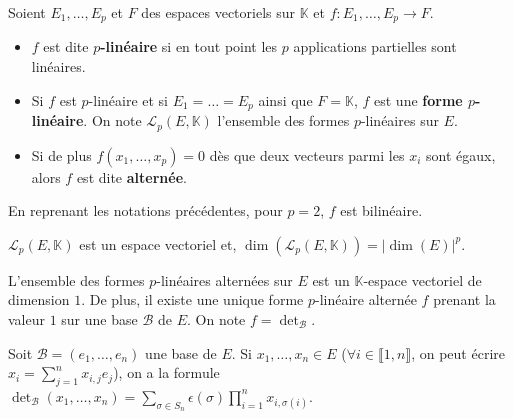 	\begin{definition}
		Soient $E_1, \dots, E_p$ et $F$ des espaces vectoriels sur $\mathbb{K}$ et $f : E_1, \dots, E_p \rightarrow F$.
		\begin{itemize}
			\item $f$ est dite \textbf{$p$-linéaire} si en tout point les $p$ applications partielles sont linéaires.
			\item Si $f$ est $p$-linéaire et si $E_1 = \dots = E_p$ ainsi que $F = \mathbb{K}$, $f$ est une \textbf{forme $p$-linéaire}. On note $\mathcal{L}_p(E, \mathbb{K})$ l'ensemble des formes $p$-linéaires sur $E$.
			\item Si de plus $f(x_1, \dots, x_p) = 0$ dès que deux vecteurs parmi les $x_i$ sont égaux, alors $f$ est dite \textbf{alternée}.
		\end{itemize}
	\end{definition}

	\begin{example}
		En reprenant les notations précédentes, pour $p = 2$, $f$ est bilinéaire.
	\end{example}

	\begin{proposition}
		$\mathcal{L}_p(E, \mathbb{K})$ est un espace vectoriel et, $\operatorname{dim}(\mathcal{L}_p(E, \mathbb{K})) = |\operatorname{dim}(E)|^p$.
	\end{proposition}

	\begin{theorem}
		L'ensemble des formes $p$-linéaires alternées sur $E$ est un $\mathbb{K}$-espace vectoriel de dimension $1$. De plus, il existe une unique forme $p$-linéaire alternée $f$ prenant la valeur $1$ sur une base $\mathcal{B}$ de $E$. On note $f = \det_{\mathcal{B}}$.
	\end{theorem}

	\begin{proposition}
		Soit $\mathcal{B} = (e_1, \dots, e_n)$ une base de $E$. Si $x_1, \dots, x_n \in E$ ($\forall i \in \llbracket 1, n \rrbracket$, on peut écrire $x_i = \sum_{j=1}^n x_{i,j} e_j$), on a la formule $\det_{\mathcal{B}}(x_1, \dots, x_n) = \sum_{\sigma \in S_n} \epsilon(\sigma) \prod_{i=1}^n x_{i,\sigma(i)}$.
	\end{proposition}

